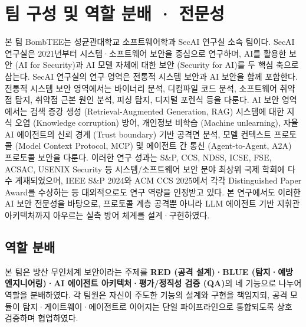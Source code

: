 \section{팀 구성 및 역할 분배 · 전문성}

본 팀 BombTEE는 성균관대학교 소프트웨어학과 SecAI 연구실 소속 팀이다. 
%
SecAI 연구실은 2021년부터 시스템·소프트웨어 보안을 중심으로 연구하며, 
AI를 활용한 보안 (AI for Security)과 AI 모델 자체에 대한 보안 (Security for AI)를 두 핵심 축으로 삼는다.
%
SecAI 연구실의 연구 영역은 전통적 시스템 보안과 AI 보안을 함께 포함한다. 전통적 시스템 보안 영역에서는 바이너리 분석, 디컴파일 코드 분석, 소프트웨어 취약점 탐지, 취약점 근본 원인 분석, 피싱 탐지, 디지털 포렌식 등을 다룬다. 
%
AI 보안 영역에서는 검색 증강 생성 (Retrieval-Augmented Generation, RAG) 시스템에 대한 지식 오염 (Knowledge corruption) 방어, 개인정보 비학습 (Machine unlearning), 자율 AI 에이전트의 신뢰 경계 (Trust boundary) 기반 공격면 분석, 모델 컨텍스트 프로토콜 (Model Context Protocol, MCP) 및 에이전트 간 통신 (Agent-to-Agent, A2A) 프로토콜 보안을 다룬다.
%
이러한 연구 성과는 S\&P, CCS, NDSS, ICSE, FSE, ACSAC, USENIX Security 등 시스템/소프트웨어 보안 분야 최상위 국제 학회에 다수 게재되었으며, IEEE S\&P 2024와 ACM CCS 2025에서 각각 Distinguished Paper Award를 수상하는 등 대외적으로도 연구 역량을 인정받고 있다. 본 연구에서도 이러한 AI 보안 전문성을 바탕으로, 프로토콜 계층 공격뿐 아니라 LLM 에이전트 기반 지휘관 아키텍처까지 아우르는 실측 방어 체계를 설계·구현하였다.

\subsection{역할 분배}

본 팀은 방산 무인체계 보안이라는 주제를 \textbf{RED (공격 설계)·BLUE (탐지·예방 엔지니어링)·AI 에이전트 아키텍처·평가/정직성 검증 (QA)}의 네 기능으로 나누어 역할을 분배하였다. 각 팀원은 자신이 주도한 기능의 설계와 구현을 책임지되, 공격 모듈이 탐지·게이트웨이·에이전트로 이어지는 단일 파이프라인으로 통합되도록 상호 검증하며 협업하였다.

